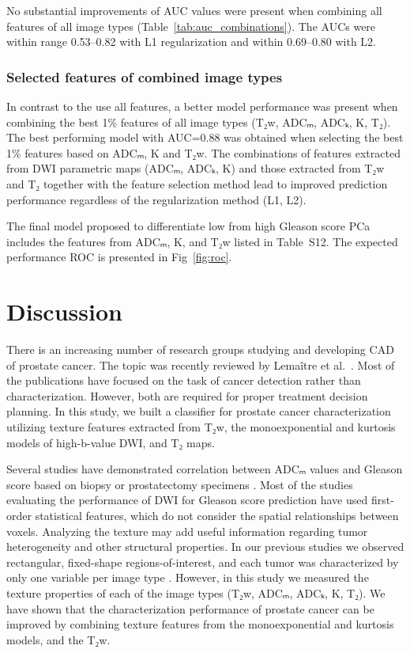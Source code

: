 \documentclass[10pt,letterpaper]{article}
\newcommand{\citep}{\cite}
\begin{document}
No substantial improvements of AUC values were present when combining all
features of all image types (Table~\ref{tab:auc_combinations}). The AUCs were
within range 0.53--0.82 with L1 regularization and within 0.69--0.80 with L2.


\subsubsection{Selected features of combined image types}

In contrast to the use all features, a better model performance was present when
combining the best 1\% features of all image types (T₂w, ADCₘ, ADCₖ, K,
T₂). The best performing model with AUC=0.88 was obtained when selecting the
best 1\% features based on ADCₘ, K and T₂w. The combinations of features
extracted from DWI parametric maps (ADCₘ, ADCₖ, K) and those extracted from T₂w
and T₂ together with the feature selection method lead to improved prediction
performance regardless of the regularization method (L1, L2).

The final model proposed to differentiate low from high Gleason score PCa
includes the features from ADCₘ, K, and T₂w listed in Table~S12. The expected
performance ROC is presented in Fig~\ref{fig:roc}.

%
\newpage
\section{Discussion}

There is an increasing number of research groups studying and developing CAD of
prostate cancer. The topic was recently reviewed by Lemaître et
al.\ \cite{Lemaitre2015}. Most of the publications have focused on the task of
cancer detection rather than characterization. However, both are required for
proper treatment decision planning. In this study, we built a classifier for
prostate cancer characterization utilizing texture features extracted from T₂w,
the monoexponential and kurtosis models of high-b-value DWI, and T₂ maps.

Several studies have demonstrated correlation between ADCₘ values and Gleason
score based on biopsy \citep{Turkbey2011, Tamada2008} or prostatectomy specimens
\citep{Toivonen2015, Peng2013, Boesen2015, Rosenkrantz2015, Donati2014}. Most of
the studies evaluating the performance of DWI for Gleason score prediction have
used first-order statistical features, which do not consider the spatial
relationships between voxels. Analyzing the texture may add useful information
regarding tumor heterogeneity and other structural properties. In our previous
studies we observed rectangular, fixed-shape regions-of-interest, and each tumor
was characterized by only one variable per image type \citep{Toivonen2015,
Jambor2015Relaxation, Jambor2015Rotating}. However, in this study we measured
the texture properties of each of the image types (T₂w, ADCₘ, ADCₖ, K, T₂).
We have shown that the characterization performance of prostate cancer can be
improved by combining texture features from the monoexponential and kurtosis
models, and the T₂w.
\end{document}
